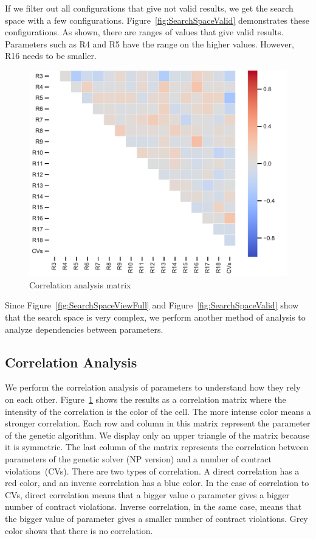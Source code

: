 If we filter out all configurations that give not valid results, we get the search space with a few configurations. Figure~\ref{fig:SearchSpaceValid} demonstrates these configurations. As shown, there are ranges of values that give valid results. Parameters such as R4 and R5 have the range on the higher values. However, R16 needs to be smaller.

\begin{figure}
	\centering
	\includegraphics[width=\textwidth]{images/CorrelationAnalysis.pdf}
	\caption[Correlation analysis matrix]{Correlation analysis matrix}
	\label{fig:CorrelationAnalysis}
\end{figure}

Since Figure~\ref{fig:SearchSpaceViewFull} and Figure~\ref{fig:SearchSpaceValid} show that the search space is very complex, we perform another method of analysis to analyze dependencies between parameters.

\subsection{Correlation Analysis}

We perform the correlation analysis of parameters to understand how they rely on each other. Figure~\ref{fig:CorrelationAnalysis} shows the results as a correlation matrix where the intensity of the correlation is the color of the cell. The more intense color means a stronger correlation. Each row and column in this matrix represent the parameter of the genetic algorithm. We display only an upper triangle of the matrix because it is symmetric. The last column of the matrix represents the correlation between parameters of the genetic solver (NP version) and a number of contract violations~(CVs). There are two types of correlation. A direct correlation has a red color, and an inverse correlation has a blue color. In the case of correlation to CVs, direct correlation means that a bigger value o parameter gives a bigger number of contract violations. Inverse correlation, in the same case, means that the bigger value of parameter gives a smaller number of contract violations. Grey color shows that there is no correlation.

